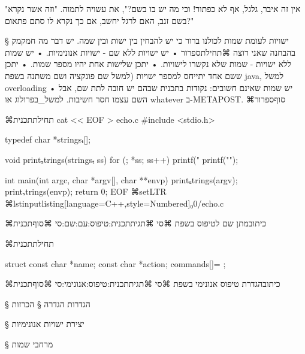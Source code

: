 "אין זה איבר, גלגל, אף לא כפתור! וכי מה יש בו בשם?", את עשויה לתמוה. "וזה אשר
נקרא בשם זנב, האם לרגל יחשב, אם כך נקרא לו סתם פתאום?"

§ ישויות לעומת שמות
לכולנו ברור כי יש להבחין בין ישות ובין שמה.
יש דבר מה חמקמק בהבחנה שאני רוצה
⌘תחילת{ספרור}
• יש ישויות ללא שם - ישויות אנונימיות.
• יש שמות ללא ישויות - שמות שלא נקשרו לישויות.
• יתכן שלישות אחת יהיו מספר שמות.
• יתכן ששם אחד יתייחס למספר ישויות (למשל שם פונקציה ושם משתנה בשפת java, למשל overloading
• יש שמות שאינם חשובים: נקודות בתכנית שבהם יש חובה לתת שם, אבל השם עצמו חסר
חשיבות. למשל_בפרולוג או whatever ב-METAPOST.
⌘סוף{ספרור}

⌘תחילת{תכנית}
\bash
cat << EOF > echo.c
#include <stdio.h>

typedef char *stringsₜ[];

void printₛtrings(stringsₜ ss) {
  for (; *ss; ss++)
    printf("%
  printf("\n");
}

int main(int argc, char *argv[], char **envp) {
  printₛtrings(argv);
  printₛtrings(envp);
  return 0;
}
EOF
\END
⌘setLTR
⌘lstinputlisting[language=C++,style=Numbered]{₀0/echo.c}

⌘כיתוב{מתן שם לטיפוס בשפת ⌘סי}
⌘תגית{תכנית:טיפוס:עם:שם:סי}
⌘סוף{תכנית}

⌘תחילת{תכנית}
\begin{CPPn}
struct {
  const char *name;
  const char *action;
} commands[]={
};
\end{CPPn}
⌘כיתוב{הגדרת טיפוס אנונימי בשפת ⌘סי}
⌘תגית{תכנית:טיפוס:אנונימי:סי}
⌘סוף{תכנית}

§ הגדרות
הגדרה
§ הכרזות

§ יצירת ישויות אנונימיות

§ מרחבי שמות
